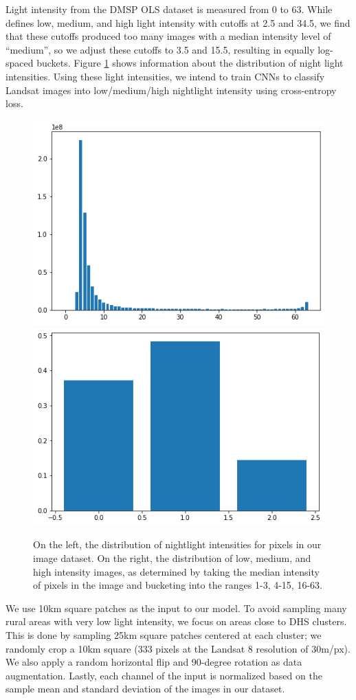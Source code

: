 \documentclass[]{article}
\begin{document}
Light intensity from the DMSP OLS dataset is measured from 0 to 63. While \cite{jean2016combining} defines low, medium, and high light intensity with cutoffs at 2.5 and 34.5, we find that these cutoffs produced too many images with a median intensity level of ``medium'', so we adjust these cutoffs to 3.5 and 15.5, resulting in equally log-spaced buckets. Figure \ref{fig:nightlight} shows information about the distribution of night light intensities. Using these light intensities, we intend to train CNNs to classify Landsat images into low/medium/high nightlight intensity using cross-entropy loss.

\begin{figure}[t]
\centering
\includegraphics[width=.4\linewidth]{nightlight_hist.png}
\includegraphics[width=.4\linewidth]{nightlight_buckets.png}
\caption{On the left, the distribution of nightlight intensities for pixels in our image dataset. On the right, the distribution of low, medium, and high intensity images, as determined by taking the median intensity of pixels in the image and bucketing into the ranges 1-3, 4-15, 16-63.}
\label{fig:nightlight}
\end{figure}

We use 10km square patches as the input to our model. To avoid sampling many rural areas with very low light intensity, we focus on areas close to DHS clusters. This is done by sampling 25km square patches centered at each cluster; we randomly crop a 10km square (333 pixels at the Landsat 8 resolution of 30m/px). We also apply a random horizontal flip and 90-degree rotation as data augmentation. Lastly, each channel of the input is normalized based on the sample mean and standard deviation of the images in our dataset.
\end{document}
